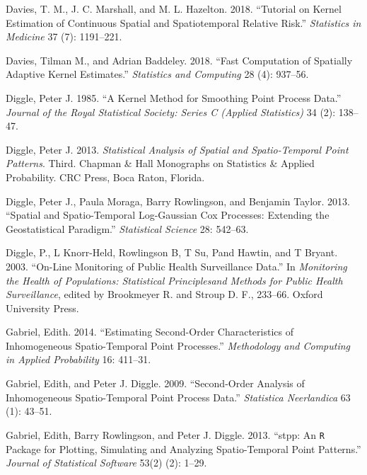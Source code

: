 \begin{CSLReferences}{1}{0}
\leavevmode{}%
Davies, T. M., J. C. Marshall, and M. L. Hazelton. 2018. {``Tutorial on Kernel Estimation of Continuous Spatial and Spatiotemporal Relative Risk.''} \emph{Statistics in Medicine} 37 (7): 1191--221.

\leavevmode{}%
Davies, Tilman M., and Adrian Baddeley. 2018. {``Fast Computation of Spatially Adaptive Kernel Estimates.''} \emph{Statistics and Computing} 28 (4): 937--56.

\leavevmode{}%
Diggle, Peter J. 1985. {``A Kernel Method for Smoothing Point Process Data.''} \emph{Journal of the Royal Statistical Society: Series C (Applied Statistics)} 34 (2): 138--47.

\leavevmode{}%
Diggle, Peter J. 2013. \emph{Statistical Analysis of Spatial and Spatio-Temporal Point Patterns}. Third. Chapman \& Hall Monographs on Statistics \& Applied Probability. CRC Press, Boca Raton, Florida.

\leavevmode{}%
Diggle, Peter J., Paula Moraga, Barry Rowlingson, and Benjamin Taylor. 2013. {``Spatial and Spatio-Temporal Log-{G}aussian {C}ox Processes: Extending the Geostatistical Paradigm.''} \emph{Statistical Science} 28: 542--63.

\leavevmode{}%
Diggle, P., L Knorr-Held, Rowlingson B, T Su, Pand Hawtin, and T Bryant. 2003. {``On-Line Monitoring of Public Health Surveillance Data.''} In \emph{Monitoring the Health of Populations: Statistical Principlesand Methods for Public Health Surveillance}, edited by Brookmeyer R. and Stroup D. F., 233--66. Oxford University Press.

\leavevmode{}%
Gabriel, Edith. 2014. {``Estimating Second-Order Characteristics of Inhomogeneous Spatio-Temporal Point Processes.''} \emph{Methodology and Computing in Applied Probability} 16: 411--31.

\leavevmode{}%
Gabriel, Edith, and Peter J. Diggle. 2009. {``Second-Order Analysis of Inhomogeneous Spatio-Temporal Point Process Data.''} \emph{Statistica Neerlandica} 63 (1): 43--51.

\leavevmode{}%
Gabriel, Edith, Barry Rowlingson, and Peter J. Diggle. 2013. {``{stpp}: An {\texttt{R}} Package for Plotting, Simulating and Analyzing Spatio-Temporal Point Patterns.''} \emph{Journal of Statistical Software} 53(2) (2): 1--29.


\end{CSLReferences}
